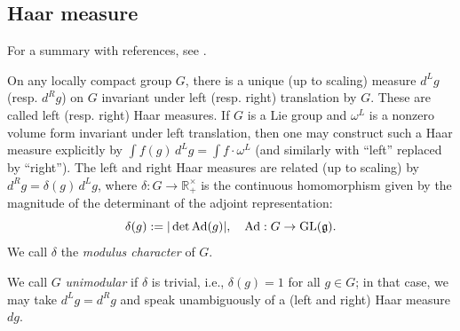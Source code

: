 \documentclass[reqno]{amsart} 
\begin{document}
\subsection{Haar measure} \label{sec:org2326c58}
For a summary with references, see \cite[\S2.9]{MR1482800}.


On any locally compact group $G$, there is a unique (up to scaling) measure $d^L g$ (resp. $d^R g$) on $G$ invariant under left (resp. right) translation by $G$.  These are called left (resp. right) Haar measures.  If $G$ is a Lie group and $\omega^L$ is a nonzero volume form invariant under left translation, then one may construct such a Haar measure explicitly by $\int f (g) \, d ^L g = \int f \cdot \omega^L$ (and similarly with ``left'' replaced by ``right'').  The left and right Haar measures are related (up to scaling) by $d^R g = \delta(g) \, d^L g$, where $\delta : G \rightarrow \mathbb{R}^\times_+$ is the continuous homomorphism given by the magnitude of the determinant of the adjoint representation:
\begin{equation*}
  \delta(g) := |\det \operatorname{Ad}(g)|, \quad \operatorname{Ad} : G \rightarrow
  \operatorname{GL}(\mathfrak{g}).
\end{equation*}
We call $\delta$ the \emph{modulus character} of $G$.

We call $G$ \emph{unimodular} if $\delta$ is trivial, i.e., $\delta(g) = 1$ for all $g \in G$; in that case, we may take $d^L g = d^R g$ and speak unambiguously of a (left and right) Haar measure $d g$.
\end{document}
